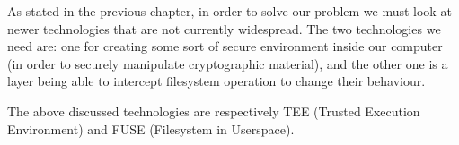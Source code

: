 \documentclass[../main.tex]{subfiles}
\begin{document}
\par As stated in the previous chapter, in order to solve our problem we must look at newer technologies that are not currently widespread. The two technologies we need are: one for creating some sort of secure environment inside our computer (in order to securely manipulate cryptographic material), and the other one is a layer being able to intercept filesystem operation to change their behaviour.
\par The above discussed technologies are respectively TEE (Trusted Execution Environment) and FUSE (Filesystem in Userspace).
\end{document}
